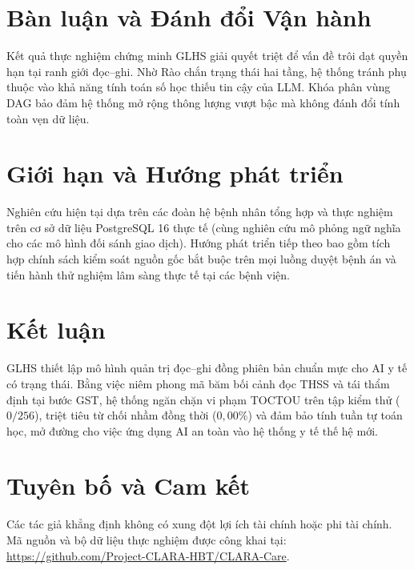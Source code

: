 \documentclass[11pt]{article}
\begin{document}
\section{Bàn luận và Đánh đổi Vận hành}
Kết quả thực nghiệm chứng minh GLHS giải quyết triệt để vấn đề trôi dạt quyền hạn tại ranh giới đọc--ghi. Nhờ Rào chắn trạng thái hai tầng, hệ thống tránh phụ thuộc vào khả năng tính toán số học thiếu tin cậy của LLM. Khóa phân vùng DAG bảo đảm hệ thống mở rộng thông lượng vượt bậc mà không đánh đổi tính toàn vẹn dữ liệu.

\section{Giới hạn và Hướng phát triển}
Nghiên cứu hiện tại dựa trên các đoàn hệ bệnh nhân tổng hợp và thực nghiệm trên cơ sở dữ liệu PostgreSQL 16 thực tế (cùng nghiên cứu mô phỏng ngữ nghĩa cho các mô hình đối sánh giao dịch). Hướng phát triển tiếp theo bao gồm tích hợp chính sách kiểm soát nguồn gốc bắt buộc trên mọi luồng duyệt bệnh án và tiến hành thử nghiệm lâm sàng thực tế tại các bệnh viện.

\section{Kết luận}
GLHS thiết lập mô hình quản trị đọc--ghi đồng phiên bản chuẩn mực cho AI y tế có trạng thái. Bằng việc niêm phong mã băm bối cảnh đọc THSS và tái thẩm định tại bước GST, hệ thống ngăn chặn vi phạm TOCTOU trên tập kiểm thử ($0/256$), triệt tiêu từ chối nhầm đồng thời ($0{,}00\%$) và đảm bảo tính tuần tự toán học, mở đường cho việc ứng dụng AI an toàn vào hệ thống y tế thế hệ mới.

\section*{Tuyên bố và Cam kết}
Các tác giả khẳng định không có xung đột lợi ích tài chính hoặc phi tài chính. Mã nguồn và bộ dữ liệu thực nghiệm được công khai tại: \url{https://github.com/Project-CLARA-HBT/CLARA-Care}.
\end{document}
